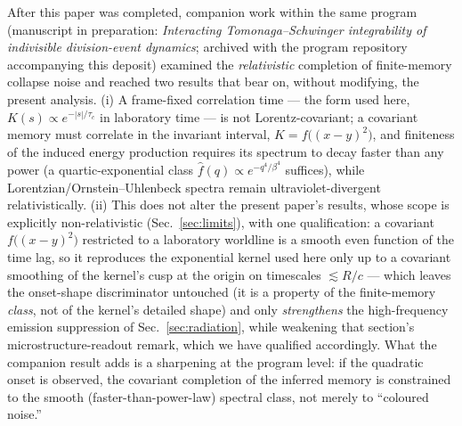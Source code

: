 \documentclass[aps,prd,onecolumn,amsmath,amssymb,nofootinbib,superscriptaddress]{revtex4-2}
\begin{document}
After this paper was completed, companion work within the same
program (manuscript in preparation: \emph{Interacting
Tomonaga--Schwinger integrability of indivisible division-event
dynamics}; archived with the program repository accompanying this
deposit) examined the \emph{relativistic} completion of
finite-memory collapse noise and reached two results that bear on,
without modifying, the present analysis.  (i) A frame-fixed
correlation time --- the form used here, $K(s)\propto e^{-|s|/\tau_c}$
in laboratory time --- is not Lorentz-covariant; a covariant memory
must correlate in the invariant interval, $K = f\bigl((x-y)^2\bigr)$,
and finiteness of the induced energy production requires its
spectrum to decay faster than any power (a quartic-exponential
class $\hat f(q)\propto e^{-q^4/\beta^4}$ suffices), while
Lorentzian/Ornstein--Uhlenbeck spectra remain ultraviolet-divergent
relativistically.  (ii) This does not alter the present paper's results,
whose scope is explicitly non-relativistic
(Sec.~\ref{sec:limits}), with one qualification: a covariant
$f\bigl((x-y)^2\bigr)$ restricted to a laboratory worldline is a
smooth even function of the time lag, so it reproduces the
exponential kernel used here only up to a covariant smoothing of
the kernel's cusp at the origin on timescales $\lesssim R/c$ ---
which leaves the onset-shape discriminator untouched (it is a
property of the finite-memory \emph{class}, not of the kernel's
detailed shape) and only \emph{strengthens} the high-frequency
emission suppression of Sec.~\ref{sec:radiation}, while weakening
that section's microstructure-readout remark, which we have
qualified accordingly.  What the
companion result adds is a sharpening at the program level: if the
quadratic onset is observed, the covariant completion of the
inferred memory is constrained to the smooth (faster-than-power-law)
spectral class, not merely to ``coloured noise.''
\end{document}
